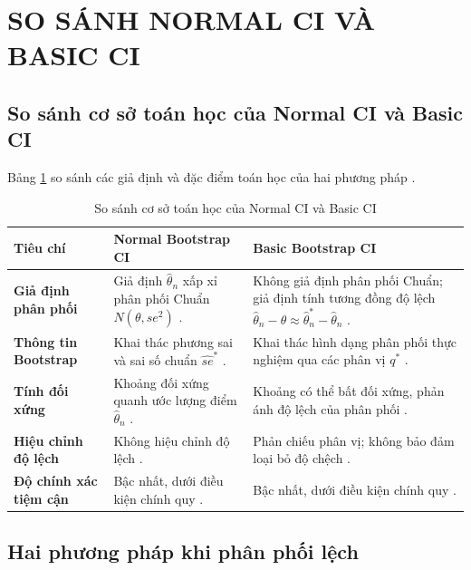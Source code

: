 \section{SO SÁNH NORMAL CI VÀ BASIC CI}
	
	\subsection{So sánh cơ sở toán học của Normal CI và Basic CI}
	Bảng \ref{tab:comparison_math} so sánh các giả định và đặc điểm toán học của hai phương pháp \cite{efron1993, davison1997}.
	\begin{table}[htbp]
		\centering
		\renewcommand{\arraystretch}{1.4}
		\setlength{\tabcolsep}{6pt}
		\caption{So sánh cơ sở toán học của Normal CI và Basic CI}
		\label{tab:comparison_math}
		\begin{tabularx}{\textwidth}{>{\raggedright\arraybackslash}p{3.2cm}XX}
			\toprule
			\textbf{Tiêu chí} & \textbf{Normal Bootstrap CI} & \textbf{Basic Bootstrap CI} \\
			\midrule
			\textbf{Giả định phân phối} & Giả định $\hat{\theta}_n$ xấp xỉ phân phối Chuẩn $N(\theta, se^2)$ \cite{efron1993}. & Không giả định phân phối Chuẩn; giả định tính tương đồng độ lệch $\hat{\theta}_n - \theta \approx \hat{\theta}_n^* - \hat{\theta}_n$ \cite{davison1997}. \\
			\textbf{Thông tin Bootstrap} & Khai thác phương sai và sai số chuẩn $\widehat{se}^*$ \cite{efron1993}. & Khai thác hình dạng phân phối thực nghiệm qua các phân vị $q^*$ \cite{davison1997}. \\
			\textbf{Tính đối xứng} & Khoảng đối xứng quanh ước lượng điểm $\hat{\theta}_n$ \cite{efron1993}. & Khoảng có thể bất đối xứng, phản ánh độ lệch của phân phối \cite{davison1997}. \\
			\textbf{Hiệu chỉnh độ lệch} & Không hiệu chỉnh độ lệch \cite{efron1993}. & Phản chiếu phân vị; không bảo đảm loại bỏ độ chệch \cite{davison1997}. \\
			\textbf{Độ chính xác tiệm cận} & Bậc nhất, dưới điều kiện chính quy \cite{efron1993}. & Bậc nhất, dưới điều kiện chính quy \cite{davison1997}. \\
			\bottomrule
		\end{tabularx}
	\end{table}
	
	\subsection{Hai phương pháp khi phân phối lệch}
	
